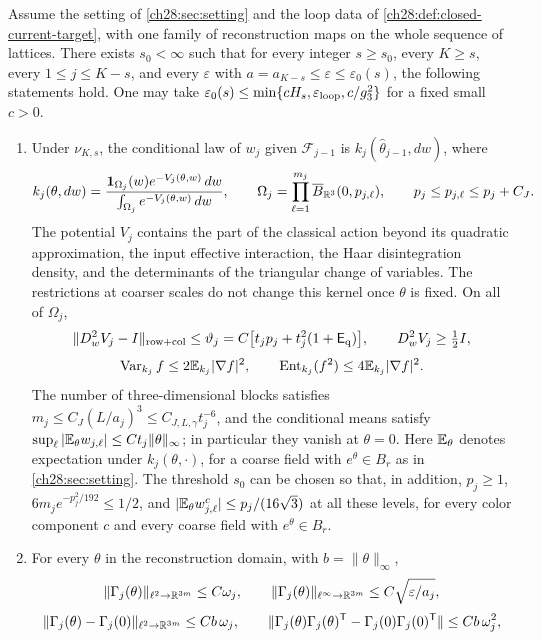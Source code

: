 \begin{theorem}\label{ch28:thm:predictable-rows-and-means}
Assume the setting of \cref{ch28:sec:setting} and the loop data of \cref{ch28:def:closed-current-target}, with one family of reconstruction maps on the whole sequence of lattices. There exists $s_0<\infty$ such that for every integer $s\ge s_0$, every $K\ge s$, every $1\le j\le K-s$, and every $\varepsilon$ with $a=a_{K-s}\le\varepsilon\le\varepsilon_0(s)$, the following statements hold. One may take $\varepsilon_0(s)\le\min\{cH_s,\varepsilon_{\rm loop},c/g_3^2\}$ for a fixed small $c>0$.
\begin{enumerate}
\item Under $\nu_{K,s}$, the conditional law of $w_j$ given $\mathcal F_{j-1}$ is $k_j(\widehat\theta_{j-1},dw)$, where
\[
 k_j(\theta,dw)=\frac{\mathbf 1_{\Omega_j}(w)e^{-V_j(\theta,w)}\,dw}{\int_{\Omega_j}e^{-V_j(\theta,w)}\,dw},\qquad \Omega_j=\prod_{\ell=1}^{m_j}\overline B_{\mathbb R^3}(0,p_{j,\ell}),\qquad p_j\le p_{j,\ell}\le p_j+C_J.
\]
The potential $V_j$ contains the part of the classical action beyond its quadratic approximation, the input effective interaction, the Haar disintegration density, and the determinants of the triangular change of variables. The restrictions at coarser scales do not change this kernel once $\theta$ is fixed. On all of $\Omega_j$,
\[
 \|D_w^2V_j-I\|_{\rm row+col}\le\vartheta_j=C\bigl[t_jp_j+t_j^2(1+\mathsf E_{\rm q})\bigr],\qquad D_w^2V_j\ge\tfrac12I,
\]
\[
 \operatorname{Var}_{k_j}f\le2\mathbb E_{k_j}|\nabla f|^2,\qquad \operatorname{Ent}_{k_j}(f^2)\le4\mathbb E_{k_j}|\nabla f|^2.
\]
The number of three-dimensional blocks satisfies $m_j\le C_J(L/a_j)^3\le C_{J,L,\gamma}t_j^{-6}$, and the conditional means satisfy $\sup_\ell|\mathbb E_\theta w_{j,\ell}|\le Ct_j\|\theta\|_\infty$; in particular they vanish at $\theta=0$. Here $\mathbb E_\theta$ denotes expectation under $k_j(\theta,\cdot)$, for a coarse field with $e^\theta\in B_r$ as in \cref{ch28:sec:setting}. The threshold $s_0$ can be chosen so that, in addition, $p_j\ge1$, $6m_je^{-p_j^2/192}\le1/2$, and $|\mathbb E_\theta w_{j,\ell}^c|\le p_j/(16\sqrt3)$ at all these levels, for every color component $c$ and every coarse field with $e^\theta\in B_r$.
\item For every $\theta$ in the reconstruction domain, with $b=\|\theta\|_\infty$,
\[
 \|\Gamma_j(\theta)\|_{\ell^2\to\mathbb R^{3m}}\le C\omega_j,\qquad \|\Gamma_j(\theta)\|_{\ell^\infty\to\mathbb R^{3m}}\le C\sqrt{\varepsilon/a_j},
\]
\[
 \|\Gamma_j(\theta)-\Gamma_j(0)\|_{\ell^2\to\mathbb R^{3m}}\le Cb\,\omega_j,\qquad \|\Gamma_j(\theta)\Gamma_j(\theta)^{\mathsf T}-\Gamma_j(0)\Gamma_j(0)^{\mathsf T}\|\le Cb\,\omega_j^2,
\]
\end{enumerate}
\end{theorem}
